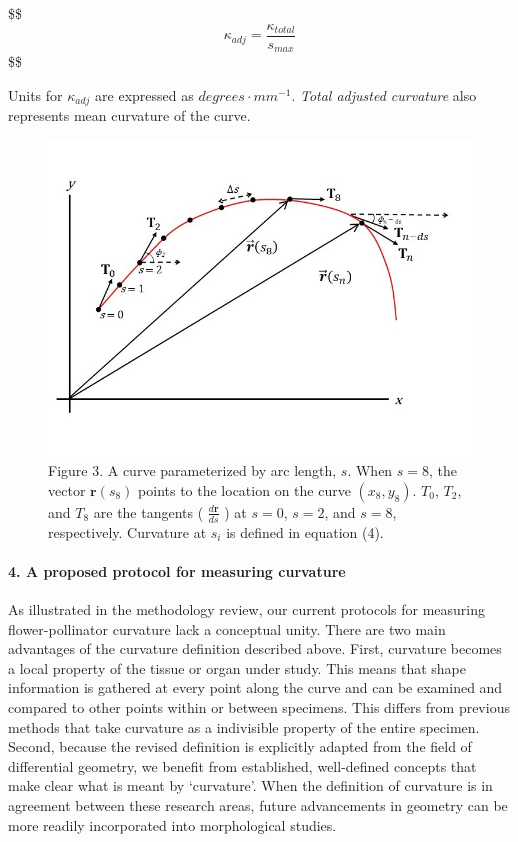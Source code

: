 \documentclass[]{article}
\let\oldparagraph\paragraph
\renewcommand{\paragraph}[1]{\oldparagraph{#1}\mbox{}}
\begin{document}
\$\$\begin{equation}
\tag{7}

\kappa_{adj} = \frac{\kappa_{total}}{s_{max}} 

\end{equation}\$\$

Units for \(\kappa_{adj}\) are expressed as \(degrees \cdot mm^{-1}\).
\emph{Total adjusted curvature} also represents mean curvature of the
curve.

\begin{figure}
\centering
\includegraphics{Figures/Figure_3.jpg}
\caption{Figure 3. A curve parameterized by arc length, \(s\). When
\(s=8\), the vector \(\mathbf{r}(s_8)\) points to the location on the
curve \((x_8, y_8)\). \(T_0\), \(T_2\), and \(T_8\) are the tangents (
\(\frac{d \mathbf{r}}{ds}\) ) at \(s=0\), \(s=2\), and \(s=8\),
respectively. Curvature at \(s_i\) is defined in equation (4).}
\end{figure}

\hypertarget{a-proposed-protocol-for-measuring-curvature}{%
\paragraph{4. A proposed protocol for measuring
curvature}\label{a-proposed-protocol-for-measuring-curvature}}

As illustrated in the methodology review, our current protocols for
measuring flower-pollinator curvature lack a conceptual unity. There are
two main advantages of the curvature definition described above. First,
curvature becomes a local property of the tissue or organ under study.
This means that shape information is gathered at every point along the
curve and can be examined and compared to other points within or between
specimens. This differs from previous methods that take curvature as a
indivisible property of the entire specimen. Second, because the revised
definition is explicitly adapted from the field of differential
geometry, we benefit from established, well-defined concepts that make
clear what is meant by `curvature'. When the definition of curvature is
in agreement between these research areas, future advancements in
geometry can be more readily incorporated into morphological studies.
\end{document}
